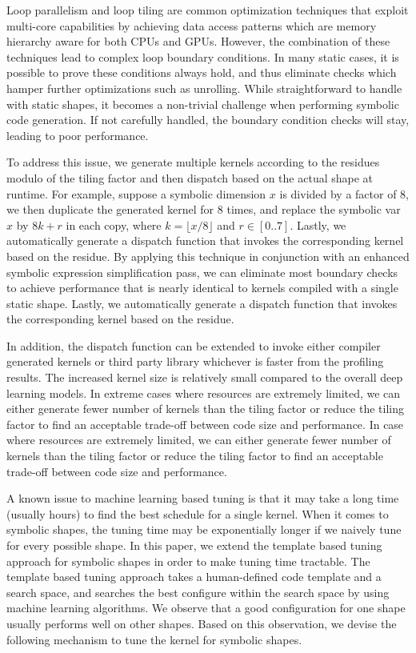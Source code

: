 Loop parallelism and loop tiling are common optimization techniques that exploit multi-core capabilities
  by achieving data access patterns which are memory hierarchy aware for both CPUs and GPUs.
However, the combination of these techniques lead to complex loop boundary conditions.
In many static cases, it is possible to prove these conditions always hold,
  and thus eliminate checks which hamper further optimizations such as unrolling.
While straightforward to handle with static shapes, it becomes a non-trivial challenge when performing symbolic code generation.
If not carefully handled, the boundary condition checks will stay, leading to poor performance.

To address this issue, we generate multiple kernels according to the residues modulo of the tiling
  factor and then dispatch based on the actual shape at runtime.
For example, suppose a symbolic dimension $x$ is divided by a factor of 8, we then duplicate the generated kernel
  for 8 times, and replace the symbolic var $x$ by $8k+r$ in each copy, where $k = \lfloor x / 8 \rfloor$ and $r \in [0..7]$.
Lastly, we automatically generate a dispatch function that invokes the corresponding kernel based on the residue.
By applying this technique in conjunction with an enhanced symbolic expression simplification pass,
  we can eliminate most boundary checks to achieve performance that is nearly identical
  to kernels compiled with a single static shape.
Lastly, we automatically generate a dispatch function that invokes the corresponding kernel based on the residue.


In addition, the dispatch function can be extended to invoke either compiler generated kernels
  or third party library whichever is faster from the profiling results.
The increased kernel size is relatively small compared to the overall deep learning models.
In extreme cases where resources are extremely limited,
  we can either generate fewer number of kernels than the tiling factor
  or reduce the tiling factor to find an acceptable trade-off
  between code size and performance.
In case where resources are extremely limited, we can either generate fewer number of kernels
than the tiling factor or reduce the tiling factor to find an acceptable trade-off between code size and performance.

A known issue to machine learning based tuning is that it may take a long time (usually hours) to find
  the best schedule for a single kernel.
When it comes to symbolic shapes, the tuning time may be exponentially longer if we
  naively tune for every possible shape.
In this paper, we extend the template based tuning approach for
  symbolic shapes in order to make tuning time tractable.
The template based tuning approach takes a human-defined
  code template and a search space, and searches the best configure
  within the search space by using machine learning algorithms.
We observe that a good configuration for one shape usually performs
  well on other shapes.
Based on this observation, we devise the following mechanism
  to tune the kernel for symbolic shapes.

